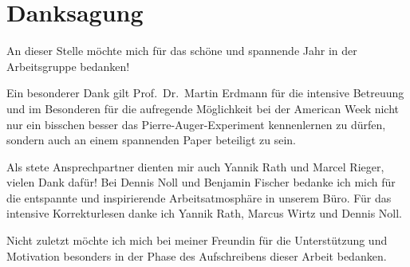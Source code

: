 \section*{Danksagung}%

An dieser Stelle m\"ochte mich f\"ur das sch\"one und spannende Jahr in der Arbeitsgruppe bedanken!

Ein besonderer Dank gilt Prof.\ Dr.\ Martin Erdmann f\"ur die intensive Betreuung und im Besonderen f\"ur die aufregende M\"oglichkeit bei der American Week nicht nur ein bisschen besser das Pierre-Auger-Experiment kennenlernen zu d\"urfen, sondern auch an einem spannenden Paper beteiligt zu sein.

Als stete Ansprechpartner dienten mir auch Yannik Rath und Marcel Rieger, vielen Dank daf\"ur! Bei Dennis Noll und Benjamin Fischer bedanke ich mich f\"ur die entspannte und inspirierende Arbeitsatmosph\"are in unserem B\"uro. F\"ur das intensive Korrekturlesen danke ich Yannik Rath, Marcus Wirtz und Dennis Noll.

Nicht zuletzt m\"ochte ich mich bei meiner Freundin f\"ur die Unterst\"utzung und Motivation besonders in der Phase des Aufschreibens dieser Arbeit bedanken.
